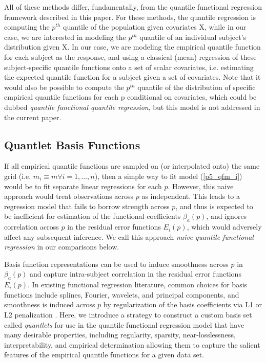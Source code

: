 \documentclass[11pt]{article}
\begin{document}
All of these methods differ, fundamentally, from the quantile functional regression framework described in this paper.  For these methods, the quantile regression is computing the $p^{th}$ quantile of the population given covariates X, while in our case, we are interested in modeling the $p^{th}$ quantile of an individual subject’s distribution given X.  In our case, we are modeling the empirical quantile function for each subject as the response, and using a classical (mean) regression of these subject-specific quantile functions onto a set of scalar covariates, i.e. estimating the expected quantile function for a subject given a set of covariates. Note that it would also be possible to compute the $p^{th}$ quantile of the distribution
of specific empirical quantile functions for each p conditional on covariates, which could be dubbed \textit{quantile functional quantile regression}, but this model is not addressed in the current paper.


\subsection{{\bf Quantlet Basis Functions}} \label{sec:quantlets} 


If all empirical quantile functions are sampled on (or interpolated onto) the same grid (i.e. $m_i \equiv m \forall i=1,\ldots,n$), then a simple way to fit model (\ref{p5_qfm_i}) would be to fit separate linear regressions for each $p$.  However, this naive approach would treat observations across $p$ as independent.  This leads to a regression model that fails to borrow strength across $p$, and thus is expected to be inefficient for estimation of the functional coefficients $\beta_a(p)$, and ignores correlation across $p$ in the residual error functions $E_i(p)$, which would adversely affect any subsequent inference.  We call this approach \textit{naive quantile functional regression} in our comparisons below.


Basis function representations can be used to induce smoothness across $p$ in $\beta_a(p)$ and capture intra-subject correlation in the residual error functions $E_i(p)$.  In existing functional regression literature, common choices for basis functions include splines, Fourier, wavelets, and principal components, and smoothness is induced across $p$ by regularization of the basis coefficients via L1 or L2 penalization \cite{morris2015functionalreg}.  Here, we introduce a strategy to construct a custom basis set called \textit{quantlets} for use in the quantile functional regression model that have many desirable properties, including regularity, sparsity, near-losslessness, interpretability, and empirical determination allowing them to capture the salient features of the empirical quantile functions for a given data set.
\end{document}
